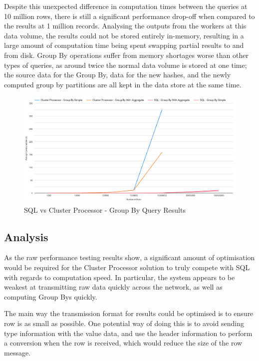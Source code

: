 Despite this unexpected difference in computation times between the queries at 10 million rows, there is still a significant performance drop-off when compared to the results at 1 million records. Analysing the outputs from the workers at this data volume, the results could not be stored entirely in-memory, resulting in a large amount of computation time being spent swapping partial results to and from disk. Group By operations suffer from memory shortages worse than other types of queries, as around twice the normal data volume is stored at one time; the source data for the Group By, data for the new hashes, and the newly computed group by partitions are all kept in the data store at the same time.

\begin{figure}[ht]
	\centering
	\includegraphics[width=0.8\linewidth]{chapters/diagrams/testing/group-by-1k-100m}
	\caption{SQL vs Cluster Processor - Group By Query Results}
	\label{fig:group-by-graph}
\end{figure}

\subsection{Analysis}
As the raw performance testing results show, a significant amount of optimisation would be required for the Cluster Processor solution to truly compete with SQL with regards to computation speed. In particular, the system appears to be weakest at transmitting raw data quickly across the network, as well as computing Group Bys quickly.

The main way the transmission format for results could be optimised is to ensure row is as small as possible. One potential way of doing this is to avoid sending type information with the value data, and use the header information to perform a conversion when the row is received, which would reduce the size of the row message. 


